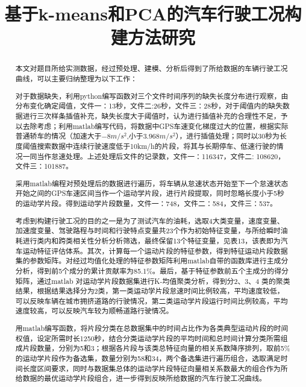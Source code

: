 \documentclass[bwprint]{gmcmthesis}
\title{基于k-means和PCA的汽车行驶工况构建方法研究}
\begin{document}
 \maketitle

\begin{abstract}
本文对题目所给实测数据，经过预处理、建模、分析后得到了所给数据的车辆行驶工况曲线，可以主要归纳整理为以下工作：


对于数据缺失，利用python编写函数对三个文件时间序列的缺失长度分布进行观察，由分布变化确定阈值，文件一：13秒，文件二:26秒，文件三：28秒，对于阈值内的缺失数据进行三次样条插值补充，缺失长度大于阈值时，认为进行插值补充的合理性不足，予以去除考虑；利用matlab编写代码，将数据中GPS车速变化梯度过大的位置，根据实际普通轿车的情况（加速大于$-8m/s^2$,小于$3.968m/s^2$），进行插值处理；同时以30秒为长度阈值搜索数据中连续行驶速度低于10km/h的片段，将其与长期停车、低速行驶的情况一同当作怠速处理。上述处理后文件的记录数，文件一：116347，文件二: 108620，文件三：101887。


采用matlab编程对预处理后的数据进行遍历，将车辆从怠速状态开始至下一个怠速状态开始之间的GPS车速区间当作一个运动学片段，进行片段提取，同时忽略长度小于5秒的运动学片段。得到运动学片段数量，文件一：748，文件二：584，文件三：537。


考虑到构建行驶工况的目的之一是为了测试汽车的油耗，选取4大类变量，速度变量、加速度变量、驾驶路程与时间和行驶特点变量共23个作为初始特征变量，与所给瞬时油耗进行类内和跨类相关性分析分析筛选，最终保留13个特征变量，见表13，该表即为汽车运动特征评估体系。其次，计算每一个运动片段的特征参数，得到特征运动片段数据集的参数矩阵。对经过均值化处理的特征参数矩阵利用matlab自带的函数库进行主成分分析，得到前5个成分的累计贡献率为85.1\%。最后，基于特征参数前五个主成分的得分矩阵，通过matlab 对运动学片段数据集进行K-均值聚类分析，得到分2、3、4 类的聚类结果，根据结果选择分为2类，第一类运动学片段怠速时间比例较高，平均速度较低，可以反映车辆在城市拥挤道路的行驶情况，第二类运动学片段运行时间比例较高，平均速度较高，可以反映汽车较为顺畅道路行驶情况。


用matlab编写函数，将片段分类在总数据集中的时间占比作为各类典型运动片段的时间权值，设定所需时长1250秒，结合分类运动学片段的平均时间和总时间计算分类所需组成片段数量，分别为5和3；根据各片段与该类总特征向量的相关系数降序排列，取前5\%的运动学片段作为备选集，数量分别为58和34，两个备选集进行遍历组合，选取满足时间长度区间要求，同时与数据集总体的运动学片段特征向量相关系数最大的组合作为所给数据的最优运动学片段组合，进一步得到反映所给数据的汽车行驶工况曲线。


\end{abstract}
\end{document}
